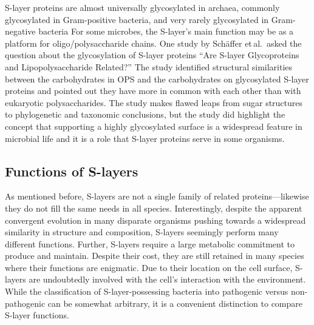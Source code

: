 \ac{S-layer} proteins are almost universally glycosylated in archaea, commonly glycosylated in Gram-positive bacteria, and very rarely glycosylated in
Gram-negative bacteria For some microbes, the \ac{S-layer}'s main function may be as a platform for oligo/polysaccharide chains. One
study by Sch\"{a}ffer et\,al.~asked the question about the glycosylation of \ac{S-layer} proteins ``Are \ac{S-layer} Glycoproteins and Lipopolysaccharide
Related?'' The study identified structural similarities
between the carbohydrates in \ac{OPS} and the carbohydrates on glycosylated
\ac{S-layer} proteins and
pointed out they have more in common with each other than with eukaryotic polysaccharides. The study makes flawed leaps from sugar structures to phylogenetic and taxonomic
conclusions, but the study did highlight the concept that supporting a highly glycosylated surface is a widespread feature in microbial life and it is a role that \ac{S-layer}
proteins serve in some organisms. %

  \subsection{Functions of S-layers}
  \label{sec:intro-slayersfunction}

  As mentioned before, \acp{S-layer} are not a single family of related proteins---likewise they do not fill the same needs in all species. Interestingly, despite the apparent
convergent evolution in many disparate organisms pushing towards a widespread similarity in structure and composition, \acp{S-layer} seemingly perform many different functions.
Further, \acp{S-layer} require a large metabolic commitment to produce and maintain. Despite their cost, they are still retained in many species where their functions are
enigmatic. Due to their location on the cell surface, \acp{S-layer} are undoubtedly involved with the cell's interaction with the environment. While the classification of
\ac{S-layer}-possessing bacteria into pathogenic versus non-pathogenic can be somewhat arbitrary, it is a convenient distinction to compare \ac{S-layer} functions.
  
